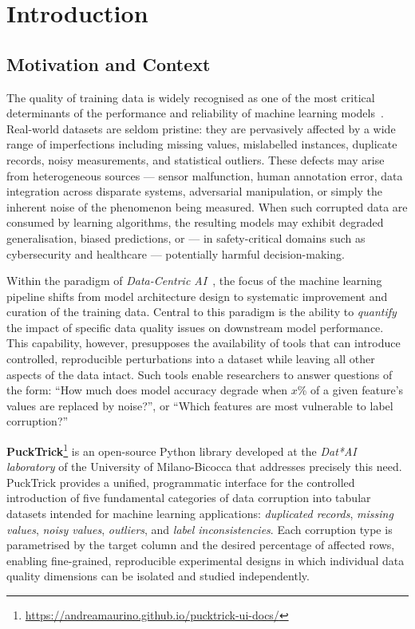 \chapter{Introduction}
\label{chap:introduction}

\section{Motivation and Context}
\label{sec:motivation}

The quality of training data is widely recognised as one of the most critical
determinants of the performance and reliability of machine learning
models~\cite{gudivada2017data, whang2023data}.  Real-world datasets are seldom
pristine: they are pervasively affected by a wide range of imperfections
including missing values, mislabelled instances, duplicate records, noisy
measurements, and statistical outliers.  These defects may arise from
heterogeneous sources — sensor malfunction, human annotation error, data
integration across disparate systems, adversarial manipulation, or simply the
inherent noise of the phenomenon being measured.  When such corrupted data are
consumed by learning algorithms, the resulting models may exhibit degraded
generalisation, biased predictions, or — in safety-critical domains such as
cybersecurity and healthcare — potentially harmful decision-making.

Within the paradigm of \emph{Data-Centric AI}~\cite{zha2023datacentric}, the
focus of the machine learning pipeline shifts from model architecture design to
systematic improvement and curation of the training data.  Central to this
paradigm is the ability to \emph{quantify} the impact of specific data quality
issues on downstream model performance.  This capability, however, presupposes
the availability of tools that can introduce controlled, reproducible
perturbations into a dataset while leaving all other aspects of the data intact.
Such tools enable researchers to answer questions of the form: ``How much does
model accuracy degrade when $x$\% of a given feature's values are replaced by
noise?'', or ``Which features are most vulnerable to label corruption?''

\textbf{PuckTrick}\footnote{\url{https://andreamaurino.github.io/pucktrick-ui-docs/}}
is an open-source Python library developed at the \emph{Dat*AI laboratory} of
the University of Milano-Bicocca that addresses precisely this need.  PuckTrick
provides a unified, programmatic interface for the controlled introduction of
five fundamental categories of data corruption into tabular datasets intended for
machine learning applications: \emph{duplicated records}, \emph{missing values},
\emph{noisy values}, \emph{outliers}, and \emph{label inconsistencies}.  Each
corruption type is parametrised by the target column and the desired percentage
of affected rows, enabling fine-grained, reproducible experimental designs in
which individual data quality dimensions can be isolated and studied
independently.


